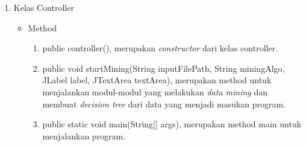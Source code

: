 \begin{enumerate}
	\item Kelas Controller
	\begin{itemize}
		\item Method
		\begin{enumerate}
			\item public controller(), merupakan \textsl{constructor} dari kelas controller.
			\item public void startMining(String inputFilePath, String miningAlgo, JLabel label, JTextArea textArea), merupakan method untuk menjalankan modul-modul yang melakukan \textsl{data mining} dan membuat \textsl{decision tree} dari data yang menjadi masukan program.
			\item public static void main(String[] args), merupakan method main untuk menjalankan program.		
		\end{enumerate}	
	\end{itemize}
	

\end{enumerate}
